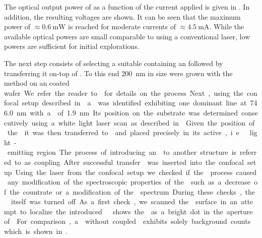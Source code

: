 	The optical output power of \BmFour as a function of the current applied is given in . In addition, the resulting voltages are shown. It can be seen that the maximum power of $\approx \SI{0.6}{\mW}$ is reached for moderate currents of $\approx \SI{4.5}{\mA}$. While the available optical powers are small comparable to using a conventional laser, low powers are sufficient for initial explorations.

	The next step consists of selecting a suitable \nd containing an \siv followed by transferring it on-top of \BmFour. To this end \nds \SI{200}{\nm} in size were grown with the \CVD method on an \ir coated \si wafer. We refer the reader to  for details on the process.

	Next, using the confocal setup described in  a \nd was identified exhibiting one dominant line at \SI{746.0}{nm} with a \lw of \SI{1.9}{nm}. Its position on the substrate was determined consecutively using a white light laser scan as described in . Given the position of the \nd it was then transferred to \BmFour and placed precisely in its active, i.e.\ light-emitting region. The process of introducing an \siv to another structure is referred to as coupling.

	After successful transfer \BmFour was inserted into the confocal setup.
	Using the laser from the confocal setup we checked if the \pp process caused any modification of the spectroscopic properties of the \siv such as a decrease of the countrate or a modification of the \fl spectrum. During these checks, the \VCSEL itself was turned off.

	As a first check, we scanned the \VCSEL surface in an attempt to localize the introduced \siv.  shows the \siv as a bright dot in the aperture of \BmFour. For comparison, a \Vcsel without coupled \siv exhibits solely background counts which is shown in .


